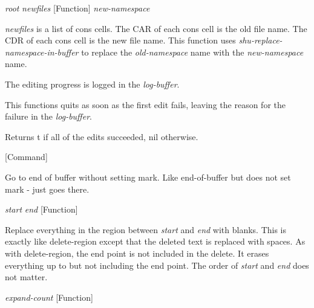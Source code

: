 \vspace{1em}
\noindent
{}
\usebox{\funcname}\emph{root} \emph{newfiles}
 \hfill [Function]
\hspace*{\wd\funcname}\emph{new-namespace}
\hspace*{\wd\funcname}

\begin{doc-string}
\emph{newfiles} is a list of cons cells.  The CAR of each cons cell is the old file
name.  The CDR of each cons cell is the new file name.  This function uses
\emph{shu-replace-namespace-in-buffer} to replace the \emph{old-namespace} name with the
\emph{new-namespace} name.

The editing progress is logged in the \emph{log-buffer}.

This functions quits as soon as the first edit fails, leaving the reason for the
failure in the \emph{log-buffer}.

Returns t if all of the edits succeeded, nil otherwise.
\end{doc-string}

\vspace{1em}
\noindent
{}
\usebox{\funcname}
 \hfill [Command]

\begin{doc-string}
Go to end of buffer without setting mark.  Like end-of-buffer
but does not set mark - just goes there.
\end{doc-string}

\vspace{1em}
\noindent
{}
\usebox{\funcname}\emph{start} \emph{end}
 \hfill [Function]

\begin{doc-string}
Replace everything in the region between \emph{start} and \emph{end} with blanks.  This is
exactly like delete-region except that the deleted text is replaced with spaces.
As with delete-region, the end point is not included in the delete.  It erases
everything up to but not including the end point.  The order of \emph{start} and \emph{end}
does not matter.
\end{doc-string}

\vspace{1em}
\noindent
{}
\usebox{\funcname}\emph{expand-count}
 \hfill [Function]

